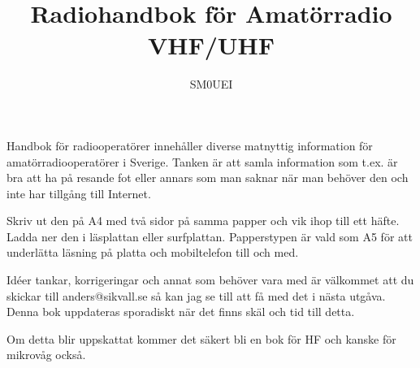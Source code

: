 
\title{Radiohandbok för Amatörradio\\
VHF/UHF}
\author{SM0UEI}
\maketitle

Handbok för radiooperatörer innehåller diverse matnyttig information för ama\-tör\-radio\-oper\-atör\-er i Sverige. Tanken är att samla information som t.ex. är bra att ha på resande fot eller annars som man saknar när man behöver den och inte har tillgång till Internet.

Skriv ut den på A4 med två sidor på samma papper och vik ihop till ett häfte. Ladda ner den i läsplattan eller surfplattan. Papperstypen är vald som A5 för att underlätta läsning på platta och mobiltelefon till och med.

Idéer tankar, korrigeringar och annat som behöver vara med är väl\-kom\-met att du skickar till anders@sikvall.se så kan jag se till att få med det i nästa utgåva. Denna bok uppdateras sporadiskt när det finns skäl och tid till detta.

Om detta blir uppskattat kommer det säkert bli en bok för HF och kanske för mikrovåg också.

\clearpage
\tableofcontents
\clearpage

\setlength{\parskip}{0.5em}
\setlength{\parindent}{0pt}
